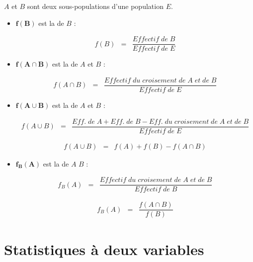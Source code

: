 \documentclass[12pt,a4paper]{article}
\begin{document}
\begin{mybilan}
	$A$ et $B$ sont deux sous-populations d'une population $E$.
	\begin{itemize}
		\item $\mathbf{f(B)}$ est la  de $B$ :
		
		\begin{eqnarray*}
			f(B) &=& \dfrac{Effectif\; de\; B }{Effectif\; de\; E}
		\end{eqnarray*}
	
		\item $\mathbf{f(A \cap B)}$ est la  de $A$ et $B$ :
		
		\begin{eqnarray*}
			f(A \cap B) &=& \dfrac{Effectif\; du\; croisement \; de\;A\; et\; de\; B }{Effectif\; de\; E}
		\end{eqnarray*}
	
		\item $\mathbf{f(A \cup B)}$ est la  de $A$ et $B$ :
		
		\begin{eqnarray*}
			f(A \cup B) &=& \dfrac{Eff.\; de\; A + Eff.\; de\; B  - Eff.\; du\; croisement \; de\;A\; et\; de\; B}{Effectif\; de\; E}
		\end{eqnarray*}
	
		\begin{eqnarray*}
			f(A \cup B) &=& f(A) + f(B) - f(A \cap B)
		\end{eqnarray*}
	
		\item $\mathbf{f_B(A)}$ est la  de $A$  $B$ :
		
		\begin{eqnarray*}
			f_B(A) &=& \dfrac{Effectif\; du\; croisement \; de\;A\; et\; de\; B }{Effectif\; de\; B}
		\end{eqnarray*}
	
		\begin{eqnarray*}
			f_B(A) &=& \dfrac{f(A \cap B)}{f(B)}
		\end{eqnarray*}
	
	
	\end{itemize}
\end{mybilan}

\newpage

\section{Statistiques à deux variables}
\end{document}

